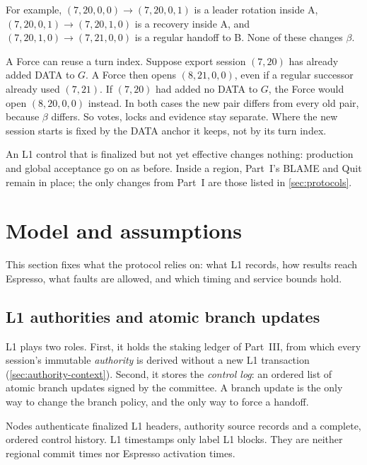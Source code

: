 \documentclass[11pt,a4paper]{article}
\newcounter{protocol}
\begin{document}
For example, $(7,20,0,0)\to(7,20,0,1)$ is a leader rotation inside A,
$(7,20,0,1)\to(7,20,1,0)$ is a recovery inside A, and
$(7,20,1,0)\to(7,21,0,0)$ is a regular handoff to B. None of these
changes $\beta$.

A Force can reuse a turn index. Suppose export session $(7,20)$ has
already added DATA to $G$. A Force then opens $(8,21,0,0)$, even if
a regular successor already used $(7,21)$. If $(7,20)$ had added no
DATA to $G$, the Force would open $(8,20,0,0)$ instead. In both cases
the new pair differs from every old pair, because $\beta$ differs. So
votes, locks and evidence stay separate. Where the new session starts is
fixed by the DATA anchor it keeps, not by its turn index.

An L1 control that is finalized but not yet effective changes nothing:
production and global acceptance go on as before. Inside a region,
Part~I's BLAME and Quit remain in place; the only changes from Part~I
are those listed in \cref{sec:protocols}.


\section{Model and assumptions}
\label{sec:model}
This section fixes what the protocol relies on: what L1 records, how
results reach Espresso, what faults are allowed, and which timing and
service bounds hold.

\subsection{L1 authorities and atomic branch updates}
\label{sec:l1}
\label{sec:runtime-controls}
L1 plays two roles. First, it holds the staking ledger of Part~III,
from which every session's immutable \emph{authority} is derived without
a new L1 transaction (\cref{sec:authority-context}). Second, it stores
the \emph{control log}: an ordered list of atomic branch updates signed
by the committee. A branch update is the only way to change the branch
policy, and the only way to force a handoff.

Nodes authenticate finalized L1 headers, authority source records and a
complete, ordered control history. L1 timestamps only label L1 blocks. They are
neither regional commit times nor Espresso activation times.
\end{document}
